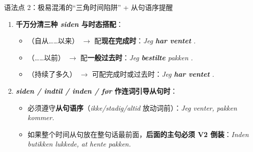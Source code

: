 \begin{grammatikbox}{语法点 2：极易混淆的“三角时间陷阱” + 从句语序提醒}
\begin{enumerate}
  \item \textbf{千万分清三种 \textit{siden} 与时态搭配}：
    \begin{itemize}
      \item {}（自从……以来） $\rightarrow$ 配\textbf{现在完成时}：\textit{Jeg \textbf{har ventet} .}
      \item {}（……以前） $\rightarrow$ 配\textbf{一般过去时}：\textit{Jeg \textbf{bestilte} pakken .}
      \item {}（持续了多久） $\rightarrow$ 可配完成时或过去时：\textit{Jeg \textbf{har ventet} .}
    \end{itemize}
  \item \textbf{\textit{siden / indtil / inden / før} 作连词引导从句时}：
    \begin{itemize}
      \item 必须遵守\textbf{从句语序}（\textit{ikke/stadig/altid} 放动词前）：\textit{Jeg venter,  pakken  kommer.}
      \item 如果整个时间从句放在整句话最前面，\textbf{后面的主句必须 V2 倒装}：\textit{Inden butikken lukkede,  at hente pakken.}
    \end{itemize}
\end{enumerate}
\end{grammatikbox}


